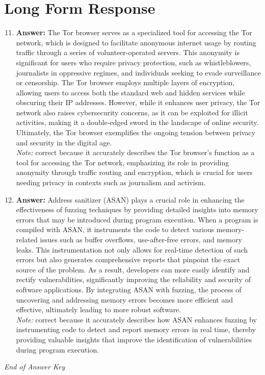 \documentclass[12pt]{article}
\begin{document}
\section*{Long Form Response}
\begin{enumerate}[label=\arabic*.]
\setcounter{enumi}{10}
\item \textbf{Answer:} The Tor browser serves as a specialized tool for accessing the Tor network, which is designed to facilitate anonymous internet usage by routing traffic through a series of volunteer-operated servers. This anonymity is significant for users who require privacy protection, such as whistleblowers, journalists in oppressive regimes, and individuals seeking to evade surveillance or censorship. The Tor browser employs multiple layers of encryption, allowing users to access both the standard web and hidden services while obscuring their IP addresses. However, while it enhances user privacy, the Tor network also raises cybersecurity concerns, as it can be exploited for illicit activities, making it a double-edged sword in the landscape of online security. Ultimately, the Tor browser exemplifies the ongoing tension between privacy and security in the digital age.
\\ \textit{Note:} correct because it accurately describes the Tor browser's function as a tool for accessing the Tor network, emphasizing its role in providing anonymity through traffic routing and encryption, which is crucial for users needing privacy in contexts such as journalism and activism.
\item \textbf{Answer:} Address sanitizer (ASAN) plays a crucial role in enhancing the effectiveness of fuzzing techniques by providing detailed insights into memory errors that may be introduced during program execution. When a program is compiled with ASAN, it instruments the code to detect various memory-related issues such as buffer overflows, use-after-free errors, and memory leaks. This instrumentation not only allows for real-time detection of such errors but also generates comprehensive reports that pinpoint the exact source of the problem. As a result, developers can more easily identify and rectify vulnerabilities, significantly improving the reliability and security of software applications. By integrating ASAN with fuzzing, the process of uncovering and addressing memory errors becomes more efficient and effective, ultimately leading to more robust software.
\\ \textit{Note:} correct because it accurately describes how ASAN enhances fuzzing by instrumenting code to detect and report memory errors in real time, thereby providing valuable insights that improve the identification of vulnerabilities during program execution.
\end{enumerate}

\vfill
\noindent\textit{End of Answer Key}
\end{document}
